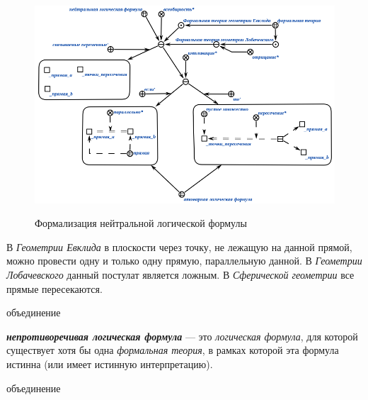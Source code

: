 \begin{figure}[H]
	\caption{Формализация нейтральной логической формулы}
	\includegraphics[scale=0.8]{author/part2/figures/logic/neutral_formula.png}
	\label{fig:neutral_formula}
\end{figure}

В \textit{Геометрии Евклида} в плоскости через точку, не лежащую на данной прямой, можно провести одну и только одну прямую, параллельную данной. В \textit{Геометрии Лобачевского} данный постулат является ложным.
В \textit{Сферической геометрии} все прямые пересекаются.

\begin{SCn}
\begin{scnreltoset}{объединение}
\end{scnreltoset}
\end{SCn}

\textbf{\textit{непротиворечивая логическая формула}} --- это \textit{логическая формула}, для которой существует хотя бы одна \textit{формальная теория}, в рамках которой эта формула истинна (или имеет истинную интерпретацию).

\begin{SCn}
\begin{scnreltoset}{объединение}
\end{scnreltoset}
\end{SCn}

